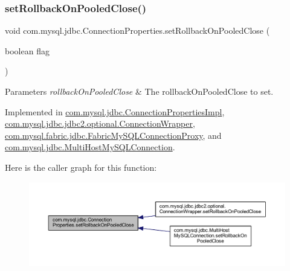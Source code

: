 \subsubsection{\texorpdfstring{set\+Rollback\+On\+Pooled\+Close()}{setRollbackOnPooledClose()}}
{\footnotesize\ttfamily void com.\+mysql.\+jdbc.\+Connection\+Properties.\+set\+Rollback\+On\+Pooled\+Close (\begin{DoxyParamCaption}\item[{boolean}]{flag }\end{DoxyParamCaption})}


\begin{DoxyParams}{Parameters}
{\em rollback\+On\+Pooled\+Close} & The rollback\+On\+Pooled\+Close to set. \\
\hline
\end{DoxyParams}


Implemented in \mbox{\hyperlink{classcom_1_1mysql_1_1jdbc_1_1_connection_properties_impl_a187ec03b36f50445fb240336726772e6}{com.\+mysql.\+jdbc.\+Connection\+Properties\+Impl}}, \mbox{\hyperlink{classcom_1_1mysql_1_1jdbc_1_1jdbc2_1_1optional_1_1_connection_wrapper_a9d43b30760d413e9c1278f85a7f63349}{com.\+mysql.\+jdbc.\+jdbc2.\+optional.\+Connection\+Wrapper}}, \mbox{\hyperlink{classcom_1_1mysql_1_1fabric_1_1jdbc_1_1_fabric_my_s_q_l_connection_proxy_a0884882386ece191be3e08a300c3a8f6}{com.\+mysql.\+fabric.\+jdbc.\+Fabric\+My\+S\+Q\+L\+Connection\+Proxy}}, and \mbox{\hyperlink{classcom_1_1mysql_1_1jdbc_1_1_multi_host_my_s_q_l_connection_a1e6e4b6adaf9cf037af7de68ede17aac}{com.\+mysql.\+jdbc.\+Multi\+Host\+My\+S\+Q\+L\+Connection}}.

Here is the caller graph for this function\+:\nopagebreak
\begin{figure}[H]
\begin{center}
\leavevmode
\includegraphics[width=350pt]{interfacecom_1_1mysql_1_1jdbc_1_1_connection_properties_ac8700288ba51d4baf2062fa2a2856b88_icgraph}
\end{center}
\end{figure}
\mbox{\label{interfacecom_1_1mysql_1_1jdbc_1_1_connection_properties_a13ef9e49985c436e69d1a8ed5eb095c6}} 

